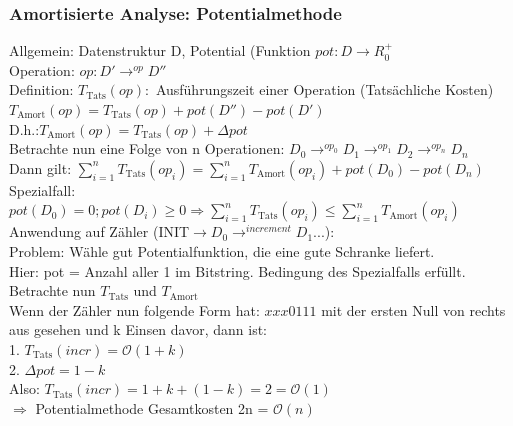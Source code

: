 \documentclass[a4paper]{article}
\newcommand{\oh}[1]{$\mathcal{O}(#1)$}
\begin{document}
\subsubsection{Amortisierte Analyse: Potentialmethode}
Allgemein: Datenstruktur D, Potential (Funktion $pot:D\rightarrow R_0^+$\\
Operation: $op: D'\rightarrow^{op}D''$\\
Definition: $T_{\text{Tats}}(op): $ Ausführungszeit einer Operation (Tatsächliche Kosten)\\
\hspace*{1cm} $T_{\text{Amort}}(op) = T_{\text{Tats}}(op)+pot(D'')-pot(D')$\\
\hspace*{1cm} D.h.:$T_{\text{Amort}}(op) = T_{\text{Tats}}(op)+\Delta pot$\\
Betrachte nun eine Folge von n Operationen: $D_0\rightarrow^{op_0}D_1\rightarrow^{op_1}D_2\rightarrow^{op_n}D_n$\\
Dann gilt: $\sum_{i=1}^n T_{\text{Tats}}(op_i) = \sum_{i=1}^n T_{\text{Amort}}(op_i) + pot(D_0) - pot(D_n)$\\
Spezialfall: $pot(D_0) = 0; pot(D_i)\geq 0 \Rightarrow \sum_{i=1}^n T_{\text{Tats}}(op_i) \leq \sum_{i=1}^n T_{\text{Amort}}(op_i)$
Anwendung auf Zähler (INIT$\rightarrow D_0 \rightarrow^{increment} D_1...$):\\
Problem: Wähle gut Potentialfunktion, die eine gute Schranke liefert.\\
Hier: pot = Anzahl aller 1 im Bitstring. Bedingung des Spezialfalls erfüllt.\\
Betrachte nun $T_{\text{Tats}}$ und $T_{\text{Amort}}$\\
Wenn der Zähler nun folgende Form hat: $xxx0111$ mit der ersten Null von rechts aus gesehen und k Einsen davor, dann ist:\\
1. $T_{\text{Tats}}(incr)=$\oh{1+k}\\
2. $\Delta pot=1-k$\\
Also: $T_{\text{Tats}}(incr)=1+k + (1-k )= 2 =$\oh{1}\\
$\Rightarrow$ Potentialmethode Gesamtkosten 2n = \oh{n}
\end{document}
